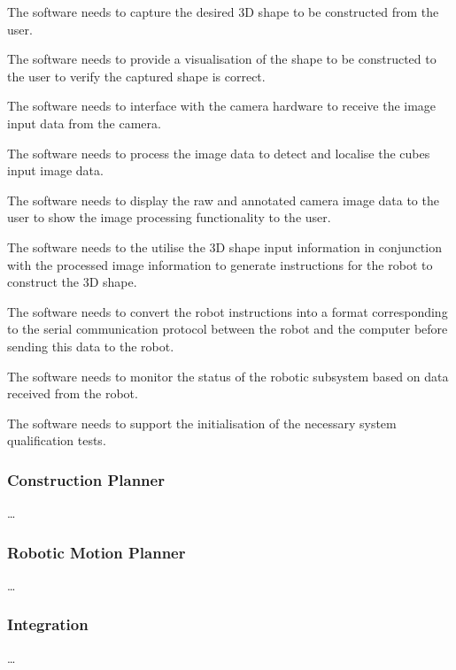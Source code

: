 \begin{compactitem}
	\item The software needs to capture the desired 3D shape to be constructed from the user.
	\item The software needs to provide a visualisation of the shape to be constructed to the user to verify the captured shape is correct.
	\item The software needs to interface with the camera hardware to receive the image input data from the camera.
	\item The software needs to process the image data to detect and localise the cubes input image data.
	\item The software needs to display the raw and annotated camera image data to the user to show the image processing functionality to the user.
	\item The software needs to the utilise the 3D shape input information in conjunction with the processed image information to generate instructions for the robot to construct the 3D shape.
	\item The software needs to convert the robot instructions into a format corresponding to the serial communication protocol between the robot and the computer before sending this data to the robot.
	\item The software needs to monitor the status of the robotic subsystem based on data received from the robot.
	\item The software needs to support the initialisation of the necessary system qualification tests.
\end{compactitem}

\subsubsection{Construction Planner}

\ldots

\subsubsection{Robotic Motion Planner}

\ldots

\subsubsection{Integration}

\ldots

\newpage


